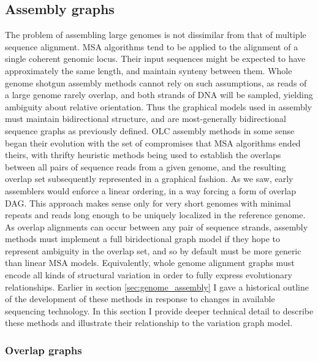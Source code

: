 \subsection{Assembly graphs}

The problem of assembling large genomes is not dissimilar from that of multiple sequence alignment.
MSA algorithms tend to be applied to the alignment of a single coherent genomic locus.
Their input sequences might be expected to have approximately the same length, and maintain synteny between them.
Whole genome shotgun assembly methods cannot rely on such assumptions, as reads of a large genome rarely overlap, and both strands of DNA will be sampled, yielding ambiguity about relative orientation.
Thus the graphical models used in assembly must maintain bidirectional structure, and are most-generally bidirectional sequence graphs as previously defined.
OLC assembly methods in some sense began their evolution with the set of compromises that MSA algorithms ended theirs, with thrifty heuristic methods being used to establish the overlaps between all pairs of sequence reads from a given genome, and the resulting overlap set subsequently represented in a graphical fashion.
As we saw, early assemblers would enforce a linear ordering, in a way forcing a form of overlap DAG.
This approach makes sense only for very short genomes with minimal repeats and reads long enough to be uniquely localized in the reference genome.
As overlap alignments can occur between any pair of sequence strands, assembly methods must implement a full biridectional graph model if they hope to represent ambiguity in the overlap set, and so by default must be more generic than linear MSA models.
Equivalently, whole genome alignment graphs must encode all kinds of structural variation in order to fully express evolutionary relationships.
Earlier in section \ref{sec:genome_assembly} I gave a historical outline of the development of these methods in response to changes in available sequencing technology.
In this section I provide deeper technical detail to describe these methods and illustrate their relationship to the variation graph model.

\subsubsection{Overlap graphs}
\label{sec:overlap_graphs}

